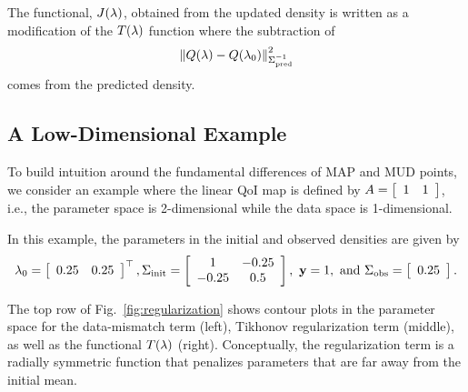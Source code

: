 The functional, $J(\param)$, obtained from the updated density is written as a modification of the $T(\param)$ function where the subtraction of
\begin{equation*}
	 \norm{Q(\param)-Q(\initialMean)}_{\predictedCov^{-1}}^2
\end{equation*}
comes from the predicted density.

\vfill
\pagebreak
\subsection{A Low-Dimensional Example}\label{subsec:low-d-example}
To build intuition around the fundamental differences of MAP and MUD points, we consider an example where the linear QoI map is defined by $A=\mat{cc}{1 & 1}$, i.e., the parameter space is 2-dimensional while the data space is 1-dimensional.

In this example, the parameters in the initial and observed densities are given by
\[
	\initialMean = \mat{cc}{0.25 & 0.25}^\top, \initialCov = \mat{cc}{1 & -0.25 \\ -0.25 & 0.5}, \ \observedMean=1, \text{ and } \observedCov = \mat{c}{0.25}.
\]

The top row of Fig.~\ref{fig:regularization} shows contour plots in the parameter space for the data-mismatch term (left), Tikhonov regularization term (middle), as well as the functional $T(\param)$ (right).
Conceptually, the regularization term is a radially symmetric function that penalizes parameters that are far away from the initial mean.

